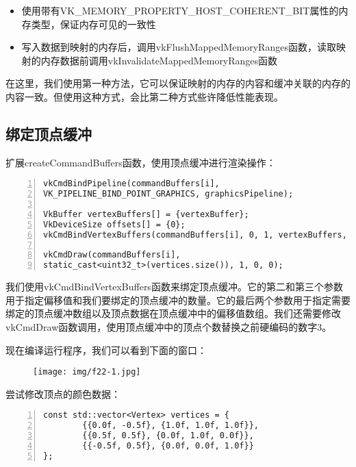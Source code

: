 \documentclass{ctexart}
\begin{document}
\begin{itemize}
	\item 使用带有VK\_MEMORY\_PROPERTY\_HOST\_COHERENT\_BIT属性的内存类型，保证内存可见的一致性
	\item 写入数据到映射的内存后，调用vkFlushMappedMemoryRanges函数，读取映射的内存数据前调用vkInvalidateMappedMemoryRanges函数
\end{itemize}

在这里，我们使用第一种方法，它可以保证映射的内存的内容和缓冲关联的内存的内容一致。但使用这种方式，会比第二种方式些许降低性能表现。

\subsection{绑定顶点缓冲}

扩展createCommandBuffers函数，使用顶点缓冲进行渲染操作：

\begin{lstlisting}[language={[ANSI]C},keywordstyle=\color{blue!70},commentstyle=\color{red!50!green!50!blue!50},frame=shadowbox, rulesepcolor=\color{red!20!green!20!blue!20},basicstyle=\small,numbers=left, numberstyle=\tiny,breaklines=true]
vkCmdBindPipeline(commandBuffers[i],
VK_PIPELINE_BIND_POINT_GRAPHICS, graphicsPipeline);

VkBuffer vertexBuffers[] = {vertexBuffer};
VkDeviceSize offsets[] = {0};
vkCmdBindVertexBuffers(commandBuffers[i], 0, 1, vertexBuffers, offsets);

vkCmdDraw(commandBuffers[i],
static_cast<uint32_t>(vertices.size()), 1, 0, 0);
\end{lstlisting}

我们使用vkCmdBindVertexBuffers函数来绑定顶点缓冲。它的第二和第三个参数用于指定偏移值和我们要绑定的顶点缓冲的数量。它的最后两个参数用于指定需要绑定的顶点缓冲数组以及顶点数据在顶点缓冲中的偏移值数组。我们还需要修改vkCmdDraw函数调用，使用顶点缓冲中的顶点个数替换之前硬编码的数字3。

现在编译运行程序，我们可以看到下面的窗口：

\begin{figure}[H]
	\centering
	\texttt{[image: img/f22-1.jpg]}
\end{figure}

尝试修改顶点的颜色数据：

\begin{lstlisting}[language={[ANSI]C},keywordstyle=\color{blue!70},commentstyle=\color{red!50!green!50!blue!50},frame=shadowbox, rulesepcolor=\color{red!20!green!20!blue!20},basicstyle=\small,numbers=left, numberstyle=\tiny,breaklines=true]
const std::vector<Vertex> vertices = {
		{{0.0f, -0.5f}, {1.0f, 1.0f, 1.0f}},
		{{0.5f, 0.5f}, {0.0f, 1.0f, 0.0f}},
		{{-0.5f, 0.5f}, {0.0f, 0.0f, 1.0f}}
};
\end{lstlisting}
\end{document}
